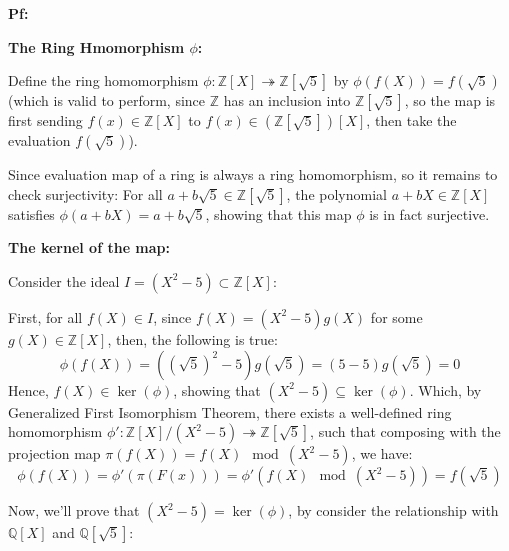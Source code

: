 \documentclass{article}
\begin{document}
\textbf{Pf:}

\textbf{The Ring Hmomorphism $\phi$:}

Define the ring homomorphism $\phi:\mathbb{Z}[X]\twoheadrightarrow \mathbb{Z}[\sqrt{5}]$ by $\phi(f(X))=f(\sqrt{5})$ (which is valid to perform,
since $\mathbb{Z}$ has an inclusion into $\mathbb{Z}[\sqrt{5}]$, so the map is first sending $f(x)\in\mathbb{Z}[X]$ to $f(x)\in(\mathbb{Z}[\sqrt{5}])[X]$, then take the evaluation $f(\sqrt{5})$).

Since evaluation map of a ring is always a ring homomorphism, so it remains to check surjectivity:
For all $a+b\sqrt{5}\in\mathbb{Z}[\sqrt{5}]$, the polynomial $a+bX\in\mathbb{Z}[X]$ satisfies $\phi(a+bX) = a+b\sqrt{5}$, showing that this map $\phi$ is in fact surjective.

\hfil

\textbf{The kernel of the map:}

Consider the ideal $I=(X^2-5)\subset \mathbb{Z}[X]$:

First, for all $f(X)\in I$, since $f(X)=(X^2-5)g(X)$ for some $g(X)\in\mathbb{Z}[X]$, then, the following is true:
$$\phi(f(X))=((\sqrt{5})^2-5)g(\sqrt{5}) = (5-5)g(\sqrt{5})=0$$
Hence, $f(X)\in \ker(\phi)$, showing that $(X^2-5)\subseteq \ker(\phi)$. Which, by Generalized First Isomorphism Theorem, there exists a well-defined ring homomorphism $\phi':\mathbb{Z}[X]/(X^2-5)\twoheadrightarrow \mathbb{Z}[\sqrt{5}]$,
such that composing with the projection map $\pi(f(X))=f(X)\mod (X^2-5)$, we have:
$$\phi(f(X))=\phi'(\pi(F(x)))=\phi'(f(X)\mod (X^2-5)) = f(\sqrt{5})$$

\hfil

Now, we'll prove that $(X^2-5)=\ker(\phi)$, by consider the relationship with $\mathbb{Q}[X]$ and $\mathbb{Q}[\sqrt{5}]$: 
\end{document}
